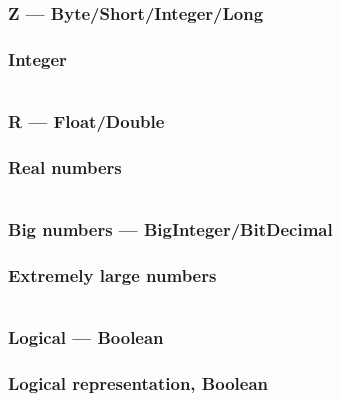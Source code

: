 \documentclass[
  11pt, %
  xcolor=dvipsnames
]{beamer}
\begin{document}
\subsubsection{Z --- Byte/Short/Integer/Long}
\begin{frame}[fragile]
	\frametitle{Integer}


	\begin{columns}[c]
		\begin{column}{0.9\textwidth}


		\end{column}
	\end{columns}

\end{frame}

\subsubsection{R --- Float/Double}
\begin{frame}[fragile]
	\frametitle{Real numbers}


	\begin{columns}[c]
		\begin{column}{0.9\textwidth}


		\end{column}
	\end{columns}

\end{frame}

\subsubsection{Big numbers --- BigInteger/BitDecimal}
\begin{frame}[fragile]
	\frametitle{Extremely large numbers}

	\begin{columns}[c]
		\begin{column}{0.9\textwidth}


		\end{column}
	\end{columns}

\end{frame}

\subsubsection{Logical --- Boolean}
\begin{frame}[fragile]
	\frametitle{Logical representation, Boolean}


	\begin{columns}[c]
		\begin{column}{0.9\textwidth}


		\end{column}
	\end{columns}

\end{frame}
\end{document}
